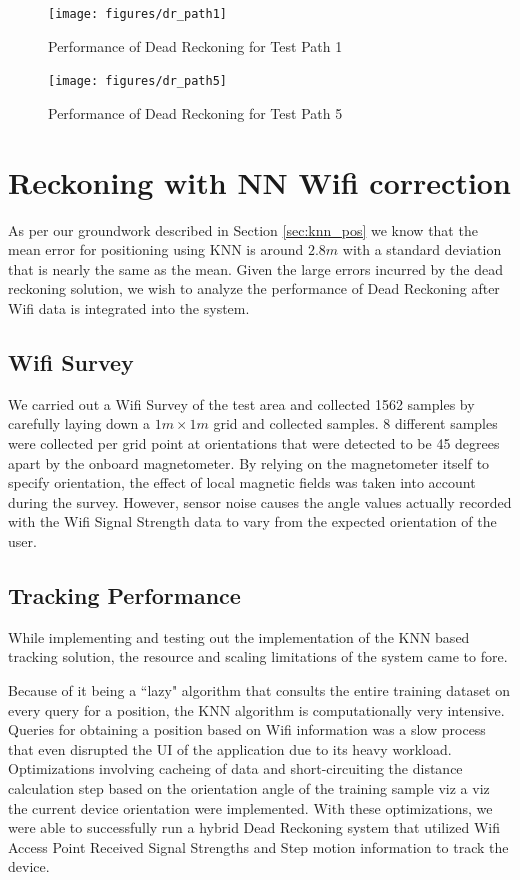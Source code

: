 \begin{figure}
    \centering
    \texttt{[image: figures/dr\_path1]}
    \caption{Performance of Dead Reckoning for Test Path 1\label{fig:dr_path1}}
\end{figure}
 
\begin{figure}
    \centering
    \texttt{[image: figures/dr\_path5]}
    \caption{Performance of Dead Reckoning for Test Path 5\label{fig:dr_path5}}
\end{figure}
 
 

\section{Reckoning with NN Wifi correction}

As per our groundwork described in Section \ref{sec:knn_pos} we know that the 
mean error for positioning using KNN is around $2.8 m$ with a standard deviation
that is nearly the same as the mean. Given the large errors incurred by 
the dead reckoning solution, we wish to analyze the performance of Dead 
Reckoning after Wifi data is integrated into the system.

\subsection{Wifi Survey}

We carried out a Wifi Survey of the test area and collected 1562 samples by 
carefully laying down a $1 m \times 1 m$ grid and collected samples. 8
different samples were collected per grid point at orientations that were
detected to be 45 degrees apart by the onboard magnetometer. By relying on
the magnetometer itself to specify orientation, the effect of local magnetic
fields was taken into account during the survey. However, sensor noise causes
the angle values actually recorded with the Wifi Signal Strength data to vary 
from the expected orientation of the user.

\subsection{Tracking Performance}

While implementing and testing out the implementation of the KNN based 
tracking solution, the resource and scaling limitations of the system 
came to fore. 

Because of it being a ``lazy" algorithm that consults the entire 
training dataset on every query for a position, the KNN algorithm
is computationally very intensive. Queries for obtaining a position based
on Wifi information was a slow process that even disrupted the UI of the 
application due to its heavy workload. Optimizations involving cacheing 
of data and short-circuiting the distance calculation step based on the 
orientation angle of the training sample viz a viz the current device 
orientation were implemented. With these optimizations, we were able 
to successfully run a hybrid Dead Reckoning system that utilized 
Wifi Access Point Received Signal Strengths and Step motion information
to track the device.

